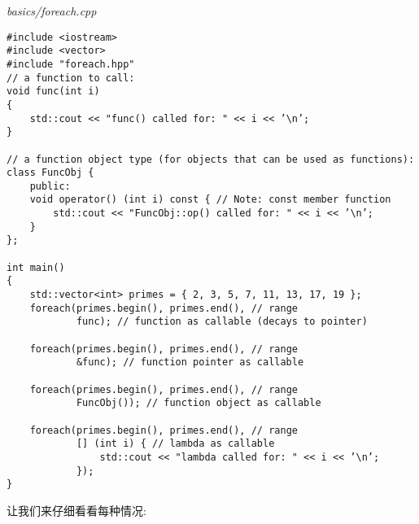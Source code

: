 \noindent
\textit{basics/foreach.cpp}
\begin{lstlisting}[style=styleCXX]
#include <iostream>
#include <vector>
#include "foreach.hpp"
// a function to call:
void func(int i)
{
	std::cout << "func() called for: " << i << ’\n’;
}

// a function object type (for objects that can be used as functions):
class FuncObj {
	public:
	void operator() (int i) const { // Note: const member function
		std::cout << "FuncObj::op() called for: " << i << ’\n’;
	}
};

int main()
{
	std::vector<int> primes = { 2, 3, 5, 7, 11, 13, 17, 19 };
	foreach(primes.begin(), primes.end(), // range
			func); // function as callable (decays to pointer)
	
	foreach(primes.begin(), primes.end(), // range
			&func); // function pointer as callable
			
	foreach(primes.begin(), primes.end(), // range
			FuncObj()); // function object as callable
	
	foreach(primes.begin(), primes.end(), // range
			[] (int i) { // lambda as callable
				std::cout << "lambda called for: " << i << ’\n’;
			});
}
\end{lstlisting}

让我们来仔细看看每种情况:

